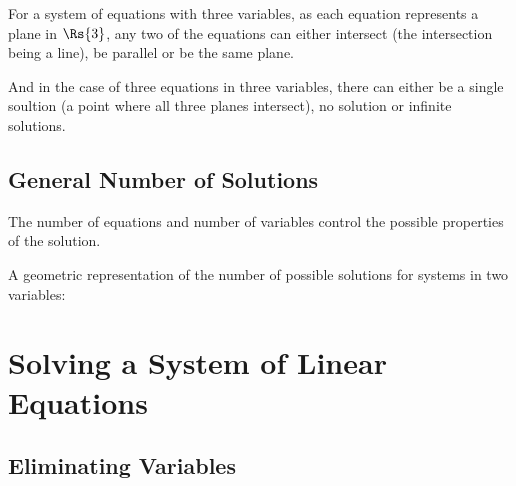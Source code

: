 For a system of equations with three variables, as each equation represents a plane in $\Rs{3}$, any two of the equations can either intersect (the intersection being a line), be parallel or be the same plane.

And in the case of three equations in three variables, there can either be a single soultion (a point where all three planes intersect), no solution or infinite solutions.

\subsection{General Number of Solutions}
The number of equations and number of variables control the possible properties of the solution.

\begin{example}
  A geometric representation of the number of possible solutions for systems in two variables:
\end{example}

\section{Solving a System of Linear Equations}
\subsection{Eliminating Variables}
